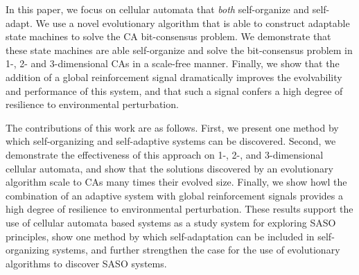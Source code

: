 In this paper, we focus on cellular automata that {\em both} self-organize and self-adapt.  We use a novel evolutionary algorithm that is able to construct adaptable state machines to solve the CA bit-consensus problem.  We demonstrate that these state machines are able self-organize and solve the bit-consensus problem in 1-, 2- and 3-dimensional CAs in a scale-free manner.  Finally, we show that the addition of a global reinforcement signal dramatically improves the evolvability and performance of this system, and that such a signal confers a high degree of resilience to environmental perturbation.

The contributions of this work are as follows.  First, we present one method by which self-organizing and self-adaptive systems can be discovered.  Second, we demonstrate the effectiveness of this approach on 1-, 2-, and 3-dimensional cellular automata, and show that the solutions discovered by an evolutionary algorithm scale to CAs many times their evolved size.  Finally, we show howl the combination of an adaptive system with global reinforcement signals provides a high degree of resilience to environmental perturbation.  These results support the use of cellular automata based systems as a study system for exploring SASO principles, show one method by which self-adaptation can be included in self-organizing systems, and further strengthen the case for the use of evolutionary algorithms to discover SASO systems.